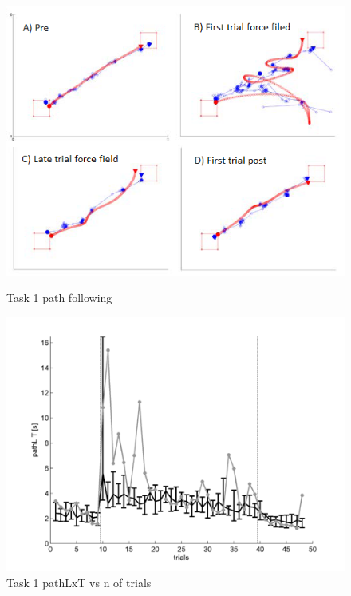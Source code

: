 \documentclass[12pt,journal,draftclsnofoot,onecolumn]{IEEEtran}
\begin{document}
\begin{figure}[t]
\centering
\begin{minipage}{0.48\textwidth}
\centering
\includegraphics[width=\textwidth]{task1.png}
\caption{Task 1 path following}
\label{fig:task1}
\end{minipage}
\begin{minipage}{0.48\textwidth}
\centering
\includegraphics[width=\textwidth]{task1_pT.png}
\caption{Task 1 pathLxT vs n of trials}
\label{fig:task1_pT}
\end{minipage}
\end{figure}
\end{document}
